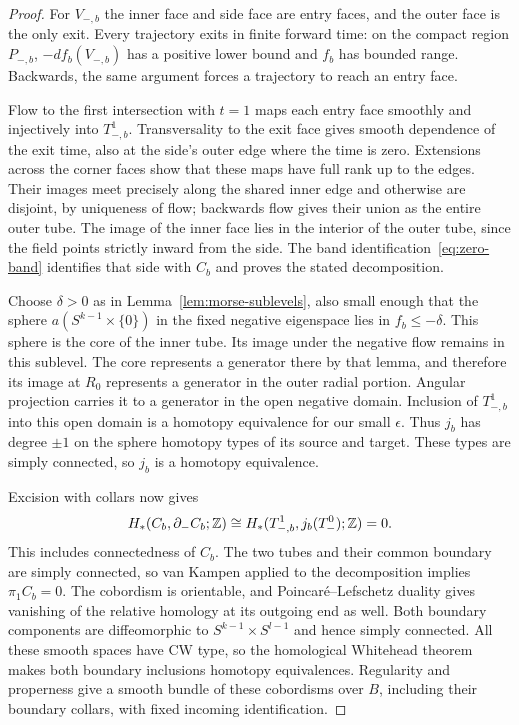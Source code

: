 \begin{proof}
For $V_{-,b}$ the inner face and side face are entry faces, and the outer face is the only exit. Every trajectory exits in finite forward time: on the compact region $P_{-,b}$, $-df_b(V_{-,b})$ has a positive lower bound and $f_b$ has bounded range. Backwards, the same argument forces a trajectory to reach an entry face.

Flow to the first intersection with $t=1$ maps each entry face smoothly and injectively into $T_{-,b}^1$. Transversality to the exit face gives smooth dependence of the exit time, also at the side's outer edge where the time is zero. Extensions across the corner faces show that these maps have full rank up to the edges. Their images meet precisely along the shared inner edge and otherwise are disjoint, by uniqueness of flow; backwards flow gives their union as the entire outer tube. The image of the inner face lies in the interior of the outer tube, since the field points strictly inward from the side. The band identification~\eqref{eq:zero-band} identifies that side with $C_b$ and proves the stated decomposition.

Choose $\delta>0$ as in Lemma~\ref{lem:morse-sublevels}, also small enough that the sphere $a(S^{k-1}\times\{0\})$ in the fixed negative eigenspace lies in $f_b\leq-\delta$. This sphere is the core of the inner tube. Its image under the negative flow remains in this sublevel. The core represents a generator there by that lemma, and therefore its image at $R_0$ represents a generator in the outer radial portion. Angular projection carries it to a generator in the open negative domain. Inclusion of $T_{-,b}^1$ into this open domain is a homotopy equivalence for our small $\epsilon$. Thus $j_b$ has degree $\pm1$ on the sphere homotopy types of its source and target. These types are simply connected, so $j_b$ is a homotopy equivalence.

Excision with collars now gives
\[
 H_*(C_b,\partial_-C_b;\mathbb Z)
 \cong H_*(T_{-,b}^1,j_b(T_-^0);\mathbb Z)=0.
\]
This includes connectedness of $C_b$. The two tubes and their common boundary are simply connected, so van Kampen applied to the decomposition implies $\pi_1C_b=0$. The cobordism is orientable, and Poincar\'e--Lefschetz duality gives vanishing of the relative homology at its outgoing end as well. Both boundary components are diffeomorphic to $S^{k-1}\times S^{l-1}$ and hence simply connected. All these smooth spaces have CW type, so the homological Whitehead theorem \cite[Corollary~4.33]{Hatcher2002} makes both boundary inclusions homotopy equivalences. Regularity and properness give a smooth bundle of these cobordisms over $B$, including their boundary collars, with fixed incoming identification.
\end{proof}

